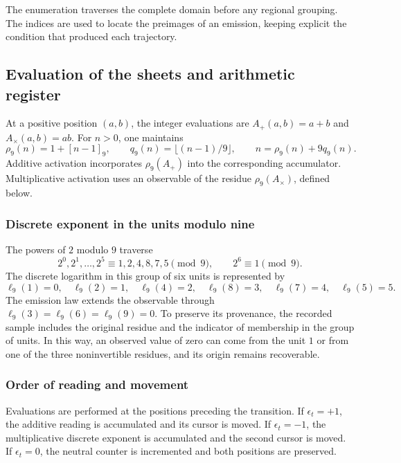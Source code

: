 The enumeration traverses the complete domain before any regional
grouping. The indices are used to locate the preimages of an
emission, keeping explicit the condition that produced each trajectory.

\subsection{Evaluation of the sheets and arithmetic register}
\label{tpk:lecturas}

At a positive position \((a,b)\), the integer evaluations are
\(A_+(a,b)=a+b\) and \(A_\times(a,b)=ab\). For \(n>0\), one maintains
\begin{equation}
 \rho_9(n)=1+[n-1]_9,\qquad
 q_9(n)=\lfloor(n-1)/9\rfloor,\qquad
 n=\rho_9(n)+9q_9(n).
 \label{tpk:division-evaluacion}
\end{equation}
Additive activation incorporates \(\rho_9(A_+)\) into the corresponding
accumulator. Multiplicative activation uses an observable of the
residue \(\rho_9(A_\times)\), defined below.

\subsubsection{Discrete exponent in the units modulo nine}

The powers of \(2\) modulo \(9\) traverse
\[
 2^0,2^1,\ldots,2^5\equiv1,2,4,8,7,5\pmod9,
 \qquad 2^6\equiv1\pmod9.
\]
The discrete logarithm in this group of six units is represented by
\begin{equation}
 \ell_9(1)=0,\quad\ell_9(2)=1,\quad\ell_9(4)=2,
 \quad\ell_9(8)=3,\quad\ell_9(7)=4,\quad\ell_9(5)=5.
 \label{tpk:logaritmo}
\end{equation}
The emission law extends the observable through
\(\ell_9(3)=\ell_9(6)=\ell_9(9)=0\). To preserve its provenance, the
recorded sample includes the original residue and the indicator of membership
in the group of units. In this way, an observed value of zero can come
from the unit \(1\) or from one of the three noninvertible residues, and its
origin remains recoverable.

\subsubsection{Order of reading and movement}

Evaluations are performed at the positions preceding the transition.
If \(\epsilon_t=+1\), the additive reading is accumulated and its cursor is moved.
If \(\epsilon_t=-1\), the multiplicative discrete exponent is accumulated and the
second cursor is moved. If \(\epsilon_t=0\), the neutral counter is
incremented and both positions are preserved.

